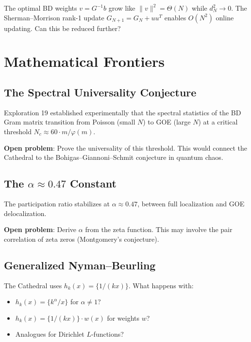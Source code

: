 \documentclass[11pt,a4paper]{article}
\begin{document}
The optimal BD weights $v = G^{-1}b$ grow like $\|v\|^2 = \Theta(N)$
while $d_N^2 \to 0$. The Sherman--Morrison rank-1 update
$G_{N+1} = G_N + uu^T$ enables $O(N^2)$ online updating. Can this
be reduced further?

\section{Mathematical Frontiers}

\subsection{The Spectral Universality Conjecture}

Exploration 19 established experimentally that the spectral
statistics of the BD Gram matrix transition from Poisson (small $N$)
to GOE (large $N$) at a critical threshold
$N_c \approx 60 \cdot m/\varphi(m)$.

\textbf{Open problem}: Prove the universality of this threshold.
This would connect the Cathedral to the Bohigas--Giannoni--Schmit
conjecture in quantum chaos.

\subsection{The $\alpha \approx 0.47$ Constant}

The participation ratio stabilizes at $\alpha \approx 0.47$,
between full localization and GOE delocalization.

\textbf{Open problem}: Derive $\alpha$ from the zeta function.
This may involve the pair correlation of zeta zeros
(Montgomery's conjecture).

\subsection{Generalized Nyman--Beurling}

The Cathedral uses $h_k(x) = \{1/(kx)\}$. What happens with:
\begin{itemize}
  \item $h_k(x) = \{k^\alpha/x\}$ for $\alpha \neq 1$?
  \item $h_k(x) = \{1/(kx)\} \cdot w(x)$ for weights $w$?
  \item Analogues for Dirichlet $L$-functions?
\end{itemize}
\end{document}
